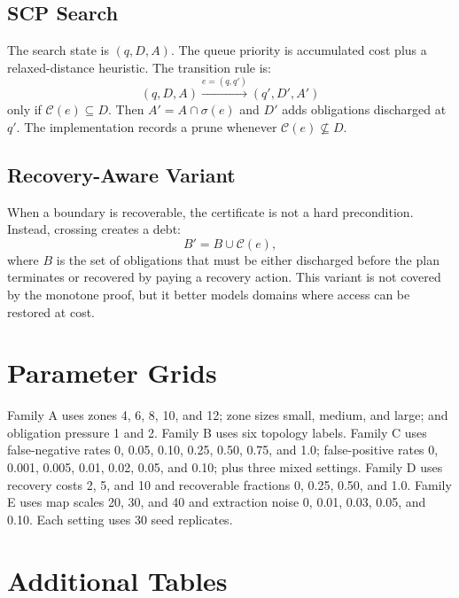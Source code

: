 \documentclass{article}
\newcommand{\cert}{\mathcal{C}}
\newcommand{\survive}{\sigma}
\begin{document}
\subsection{SCP Search}

The search state is $(q,D,A)$. The queue priority is accumulated cost plus a relaxed-distance heuristic. The transition rule is:
\[
  (q,D,A)\xrightarrow{e=(q,q')}(q',D',A')
\]
only if $\cert(e)\subseteq D$. Then $A'=A\cap\survive(e)$ and $D'$ adds obligations discharged at $q'$. The implementation records a prune whenever $\cert(e)\nsubseteq D$.

\subsection{Recovery-Aware Variant}

When a boundary is recoverable, the certificate is not a hard precondition. Instead, crossing creates a debt:
\[
  B' = B \cup \cert(e),
\]
where $B$ is the set of obligations that must be either discharged before the plan terminates or recovered by paying a recovery action. This variant is not covered by the monotone proof, but it better models domains where access can be restored at cost.

\section{Parameter Grids}

Family A uses zones 4, 6, 8, 10, and 12; zone sizes small, medium, and large; and obligation pressure 1 and 2. Family B uses six topology labels. Family C uses false-negative rates 0, 0.05, 0.10, 0.25, 0.50, 0.75, and 1.0; false-positive rates 0, 0.001, 0.005, 0.01, 0.02, 0.05, and 0.10; plus three mixed settings. Family D uses recovery costs 2, 5, and 10 and recoverable fractions 0, 0.25, 0.50, and 1.0. Family E uses map scales 20, 30, and 40 and extraction noise 0, 0.01, 0.03, 0.05, and 0.10. Each setting uses 30 seed replicates.

\section{Additional Tables}

\begin{table}[h]
  \centering
  \caption{Claim-to-evidence map for the v3 artifact.}
  \label{tab:claim-evidence}
  \resizebox{\linewidth}{!}{}
\end{table}
\end{document}

